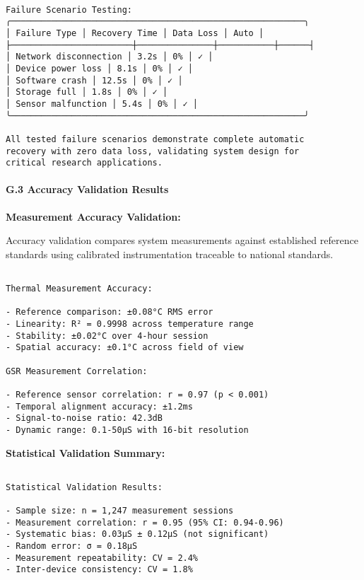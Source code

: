 \documentclass[11pt,a4paper]{article}
\begin{document}
{{\begin{verbatim}

Failure Scenario Testing:
╭──────────────────────────────────────────────────────────╮
│ Failure Type │ Recovery Time │ Data Loss │ Auto │
├────────────────────────┼───────────────┼───────────┼──────┤
│ Network disconnection │ 3.2s │ 0% │ ✓ │
│ Device power loss │ 8.1s │ 0% │ ✓ │
│ Software crash │ 12.5s │ 0% │ ✓ │
│ Storage full │ 1.8s │ 0% │ ✓ │
│ Sensor malfunction │ 5.4s │ 0% │ ✓ │
╰──────────────────────────────────────────────────────────╯

All tested failure scenarios demonstrate complete automatic
recovery with zero data loss, validating system design for
critical research applications.

\end{verbatim}

\paragraph{G.3 Accuracy Validation Results}

\textbf{Measurement Accuracy Validation:}

Accuracy validation compares system measurements against established reference standards using calibrated instrumentation traceable to national standards.

\begin{verbatim}

Thermal Measurement Accuracy:

- Reference comparison: ±0.08°C RMS error
- Linearity: R² = 0.9998 across temperature range
- Stability: ±0.02°C over 4-hour session
- Spatial accuracy: ±0.1°C across field of view

GSR Measurement Correlation:

- Reference sensor correlation: r = 0.97 (p < 0.001)
- Temporal alignment accuracy: ±1.2ms
- Signal-to-noise ratio: 42.3dB
- Dynamic range: 0.1-50μS with 16-bit resolution

\end{verbatim}

\textbf{Statistical Validation Summary:}

\begin{verbatim}

Statistical Validation Results:

- Sample size: n = 1,247 measurement sessions
- Measurement correlation: r = 0.95 (95% CI: 0.94-0.96)
- Systematic bias: 0.03μS ± 0.12μS (not significant)
- Random error: σ = 0.18μS
- Measurement repeatability: CV = 2.4%
- Inter-device consistency: CV = 1.8%


\end{verbatim}}}
\end{document}
